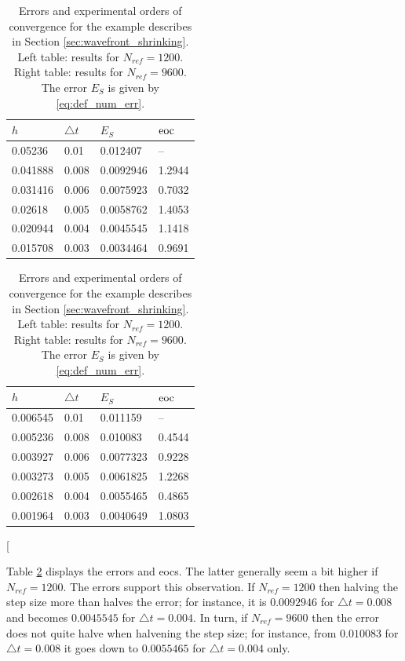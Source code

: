 \documentclass[a4paper,10pt]{article}
\def\eoc{{\rm eoc}}
\numberwithin{equation}{section}
\begin{document}
\begin{table}
\begin{center}
\begin{tabular}{|l|l|l|l|} \hline
$h$ & $\triangle t$ & $E_S$ & $\eoc$ \\ \hline \hline
     0.05236  &       0.01  &     0.012407  &         --  \\ \hline
     0.041888 &       0.008 &     0.0092946 &      1.2944 \\ \hline
     0.031416 &       0.006 &     0.0075923 &      0.7032 \\ \hline
     0.02618  &       0.005 &     0.0058762 &      1.4053 \\ \hline
     0.020944 &       0.004 &     0.0045545 &      1.1418 \\ \hline
     0.015708 &       0.003 &     0.0034464 &      0.9691 \\ \hline
\end{tabular} \hfill
\begin{tabular}{|l|l|l|l|} \hline
$h$ & $\triangle t$ & $E_S$ & $\eoc$ \\ \hline \hline
     0.006545 &       0.01  &     0.011159  &         --  \\ \hline
     0.005236 &       0.008 &     0.010083  &      0.4544 \\ \hline
     0.003927 &       0.006 &     0.0077323 &      0.9228 \\ \hline
     0.003273 &       0.005 &     0.0061825 &      1.2268 \\ \hline
     0.002618 &       0.004 &     0.0055465 &      0.4865 \\ \hline
     0.001964 &       0.003 &     0.0040649 &      1.0803 \\ \hline
\end{tabular}
\end{center}
[\caption{Errors and experimental orders of convergence for the example describes in Section \ref{sec:wavefront_shrinking}. Left table: results for $N_{ref} = 1200$. Right table: results for $N_{ref} = 9600$. The error $E_S$ is given by \eqref{eq:def_num_err}.
}
\label{tab:conv_wavefront_shrinking}
\end{table}


Table \ref{tab:conv_wavefront_shrinking} displays the errors and eocs. The latter generally seem a bit higher if $N_{ref} = 1200$. The errors support this observation. If $N_{ref} = 1200$ then halving the step size more than halves the error; for instance, it is $0.0092946$ for $\triangle t = 0.008$ and becomes $0.0045545$ for $\triangle t = 0.004$. In turn, if $N_{ref} = 9600$ then the error does not quite halve when halvening the step size; for instance, from $0.010083$ for $\triangle t = 0.008$ it goes down to $0.0055465$ for $\triangle t = 0.004$ only.
\end{document}
